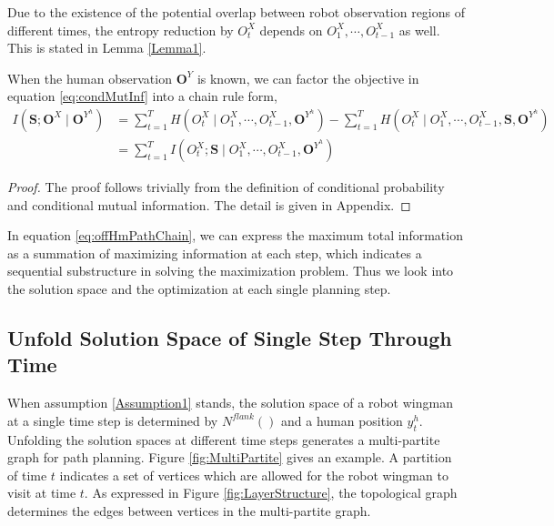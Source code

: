 Due to the existence of the potential overlap between robot observation regions of different times, the entropy reduction by $ O^{X}_{t} $ depends on $ O^{X}_{1} , \cdots , O^{X}_{t-1} $ as well.
This is stated in Lemma \ref{Lemma1}.

\begin{lem} 
\label{Lemma1}
When the human observation $ \mathbf{O}^{Y} $ is known, we can factor the objective in equation \eqref{eq:condMutInf} into a chain rule form,
\begin{equation}
\label{eq:offHmPathChain}
\begin{aligned}
I(\mathbf{S}; \mathbf{O}^{X} \mid \mathbf{O}^{Y^{h}}) & = \sum_{t=1}^{T} H(O_{t}^{X} \mid O_{1}^{X} , \cdots , O_{t-1}^{X}, \mathbf{O}^{Y^{h}}) - \sum_{t=1}^{T} H(O_{t}^{X} \mid O_{1}^{X} , \cdots , O_{t-1}^{X}, \mathbf{S}, \mathbf{O}^{Y^{h}}) \\
& = \sum_{t=1}^{T} I(O^{X}_{t} ; \mathbf{S} \mid O^{X}_{1} , \cdots , O^{X}_{t-1}, \mathbf{O}^{Y^{h}})
\end{aligned}
\end{equation}
\begin{proof}
The proof follows trivially from the definition of conditional probability and conditional mutual information. 
The detail is given in Appendix.
\end{proof}
\end{lem}

In equation \eqref{eq:offHmPathChain}, we can express the maximum total information as a summation of maximizing information at each step, which indicates a sequential substructure in solving the maximization problem.
Thus we look into the solution space and the optimization at each single planning step.

\subsection{Unfold Solution Space of Single Step Through Time}
\label{subsec:unfold_solution_space}

When assumption \ref{Assumption1} stands, the solution space of a robot wingman at a single time step is determined by $ N^{flank}() $ and a human position $ y^{h}_{t} $. Unfolding the solution spaces at different time steps generates a multi-partite graph for path planning. Figure \ref{fig:MultiPartite} gives an example. A partition of time $ t $ indicates a set of vertices which are allowed for the robot wingman to visit at time $ t $. As expressed in Figure  \ref{fig:LayerStructure}, the topological graph determines the edges between vertices in the multi-partite graph.

